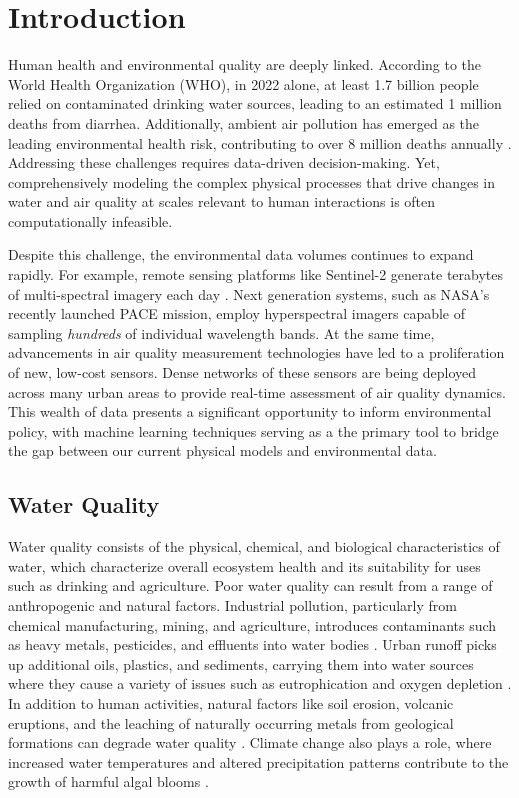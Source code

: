 \chapter{Introduction}\label{ch:intro}


Human health and environmental quality are deeply linked. According to
the World Health Organization (WHO), in 2022 alone, at least 1.7 billion people
relied on contaminated drinking water sources, leading to an estimated 1 million
deaths from diarrhea. Additionally, ambient air pollution has emerged as the
leading environmental health risk, contributing to over 8 million deaths
annually \cite{air-pollution-mortality}. Addressing these challenges requires
data-driven decision-making. Yet, comprehensively modeling the complex physical
processes that drive changes in water and air quality at scales relevant to
human interactions is often computationally infeasible.

Despite this challenge, the environmental data volumes continues to expand
rapidly. For example, remote sensing platforms like Sentinel-2 generate
terabytes of multi-spectral imagery each day \cite{sentinel-2-data}. Next
generation systems, such as NASA’s recently launched PACE mission,
employ hyperspectral imagers capable of sampling \textit{hundreds} of individual
wavelength bands. At the same time, advancements in air quality measurement
technologies have led to a proliferation of new, low-cost sensors. Dense
networks of these sensors are being deployed across many urban areas to provide
real-time assessment of air quality dynamics. This wealth of data presents a
significant opportunity to inform environmental policy, with machine learning
techniques serving as a the primary tool to bridge the gap between our current
physical models and environmental data.




\section{Water Quality}

Water quality consists of the physical, chemical, and biological characteristics
of water, which characterize overall ecosystem health and its suitability for
uses such as drinking and agriculture. Poor water quality can result from a
range of anthropogenic and natural factors. Industrial pollution, particularly
from chemical manufacturing, mining, and agriculture, introduces
contaminants such as heavy metals, pesticides, and effluents into water
bodies \cite{schwarzenbach-water-pollution}. Urban runoff
picks up additional oils, plastics, and sediments, carrying them into
water sources where they cause a variety of issues such as
eutrophication and oxygen depletion \cite{smith-eutrophication}.
In addition to human activities, natural factors like soil erosion, volcanic
eruptions, and the leaching of naturally occurring metals from geological
formations can degrade water quality \cite{water-quality-natural}. Climate
change also plays a role, where increased water temperatures and altered
precipitation patterns contribute to the growth of harmful algal blooms
\cite{climate-change-water-quality}.

